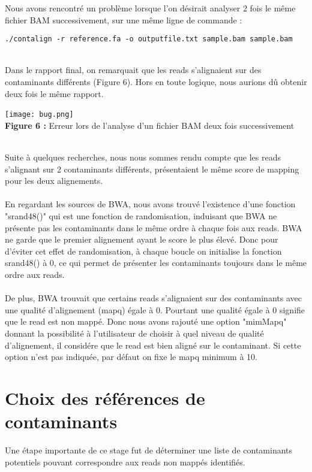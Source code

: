 \documentclass[a4paper,12pt]{article}
\begin{document}
Nous avons rencontré un problème lorsque l'on désirait analyser 2 fois le même fichier BAM successivement, sur une même ligne de commande :
\begin{lstlisting}
./contalign -r reference.fa -o outputfile.txt sample.bam sample.bam 
\end{lstlisting} 
 ~\\
 Dans le rapport final, on remarquait que les reads s'alignaient sur des contaminants différents (Figure 6). Hors en toute logique, nous aurions dû obtenir deux fois le même rapport.
\begin{center}
 \texttt{[image: bug.png]}~\\
 \textbf{Figure 6 :} Erreur lors de l'analyse d'un fichier BAM deux fois successivement
 \end{center}
 ~\\
Suite à quelques recherches, nous nous sommes rendu compte que les reads s'alignant sur 2 contaminants différents, présentaient le même score de mapping pour les deux alignements.\\
~\\
En regardant les sources de BWA, nous avons trouvé l'existence d'une fonction "srand48()" qui est une fonction de randomisation,  induisant que BWA ne présente pas les contaminants dans le même ordre à chaque fois aux reads. BWA ne garde que le premier alignement ayant le score le plus élevé. Donc pour d'éviter cet effet de randomisation, à chaque boucle on initialise la fonction srand48() à 0, ce qui permet de présenter les contaminants toujours dans le même ordre aux reads. \\
~\\

De plus, BWA trouvait que certains reads s'alignaient sur des contaminants avec une qualité d'alignement (mapq) égale à 0. Pourtant une qualité égale à 0 signifie que le read est non mappé. Donc nous avons rajouté une option "mimMapq" donnant la possibilité à l'utilisateur de choisir à quel niveau de qualité d'alignement, il considére que le read est bien aligné sur le contaminant. Si cette option n'est pas indiquée, par défaut on fixe le mapq minimum à 10.
 
\clearpage


\section{Choix des références de contaminants}

Une étape importante de ce stage fut de déterminer une liste de contaminants potentiels pouvant correspondre aux reads non mappés identifiés.\\ 
\end{document}
